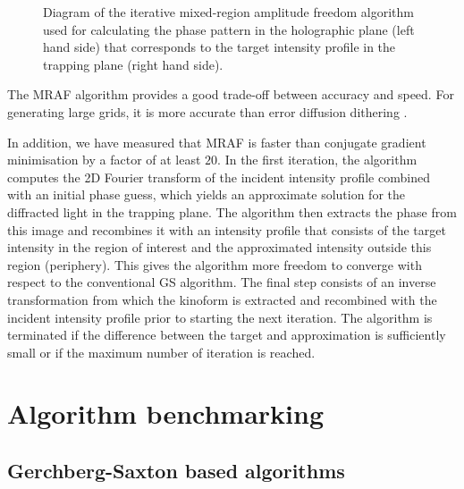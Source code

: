 \documentclass[../Thesis-IJspeert.tex]{subfiles}
\begin{document}
\begin{figure}[h]
	\caption[An example of a floating figure]{Diagram of the iterative mixed-region amplitude freedom algorithm used for calculating the phase pattern in the holographic plane (left hand side) that corresponds to the target intensity profile in the trapping plane (right hand side).} %
	\label{fig:mraf} 
\end{figure}
The MRAF algorithm provides a good trade-off between accuracy and speed. For generating large grids, it is more accurate than error diffusion dithering \cite{Holland2018}. 

In addition, we have measured that MRAF is faster than conjugate gradient minimisation by a factor of at least $20$. In the first iteration, the algorithm computes the 2D Fourier transform of the incident intensity profile combined with an initial phase guess, which yields an approximate solution for the diffracted light in the trapping plane. The algorithm then extracts the phase from this image and recombines it with an intensity profile that consists of the target intensity in the region of interest and the approximated intensity outside this region (periphery). This gives the algorithm more freedom to converge with respect to the conventional GS algorithm. The final step consists of an inverse transformation from which the kinoform is extracted and recombined with the incident intensity profile prior to starting the next iteration. The algorithm is terminated if the difference between the target and approximation is sufficiently small or if the maximum number of iteration is reached.

\section{Algorithm benchmarking}

\subsection{Gerchberg-Saxton based algorithms}
\end{document}
